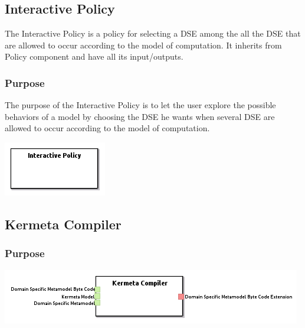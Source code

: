 \documentclass{gemoc} %
\begin{document}
\subsection{Interactive Policy}
The Interactive Policy is a policy for selecting a DSE among the all the DSE that are allowed to occur according to the model of computation.
It inherits from Policy component and have all its input/outputs.

\subsubsection{Purpose}
The purpose of the Interactive Policy is to let the user explore the possible behaviors of a model by choosing the DSE he wants when several DSE are allowed to occur according to the model of computation.

\begin{center}
\includegraphics*[trim=0.0cm 0.0cm 0cm 0.0cm, clip=true]{../images/generated/Generated_Interactive_Policy.png}
\end{center}




\subsection{Kermeta Compiler}


\subsubsection{Purpose}


\begin{center}
\includegraphics*[trim=0.0cm 0.0cm 0cm 0.0cm, clip=true]{../images/generated/Generated_Kermeta_Compiler.png}
\end{center}
\end{document}
